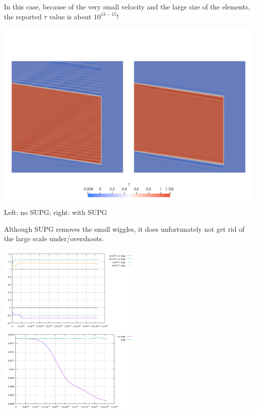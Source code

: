 In this case, because of the very small velocity and the large size of the elements,  
the reported $\tau$ value is about $10^{13-15}$! 

\begin{center}
\includegraphics[width=14cm]{python_codes/fieldstone_43/results/experiment6/T}\\
{\captionfont Left: no SUPG; right: with SUPG}
\end{center}

Although SUPG removes the small wiggles, it does unfortunately not get rid of the 
large scale under/overshoots. 

\begin{center}
\includegraphics[width=7cm]{python_codes/fieldstone_43/results/experiment6/stats_T}
\includegraphics[width=7cm]{python_codes/fieldstone_43/results/experiment6/avrg_T}
\end{center}

